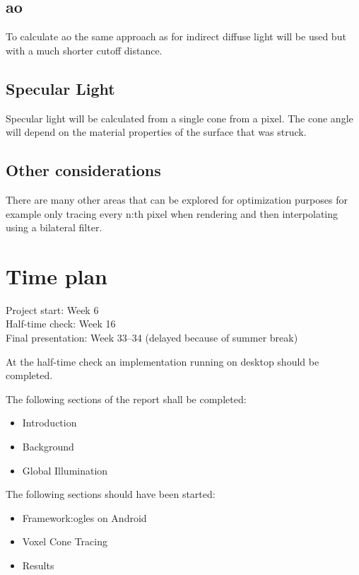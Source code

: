 \documentclass[a4paper, 12pt]{article}
\begin{document}
\subsection{\acrlong{ao}}

To calculate \gls{ao} the same approach as for indirect diffuse light will be used but with a much shorter cutoff distance.

\subsection{Specular Light}

Specular light will be calculated from a single cone from a pixel. The cone angle will depend on the material properties of the surface that was struck.

\subsection{Other considerations}

There are many other areas that can be explored for optimization purposes for example only tracing every n:th pixel when rendering and then interpolating using a bilateral filter. 

\section{Time plan}
\label{sec:Time plan}

Project start: Week 6 \\
Half-time check: Week 16 \\
Final presentation: Week 33--34 (delayed because of summer break)

At the half-time check an implementation running on desktop should be completed.

The following sections of the report shall be completed:
\begin{itemize}
  \item Introduction
  \item Background
  \item Global Illumination
\end{itemize}

The following sections should have been started:
\begin{itemize}
  \item Framework:\@ \gls{ogles} on Android
  \item Voxel Cone Tracing
  \item Results
\end{itemize}
\end{document}
